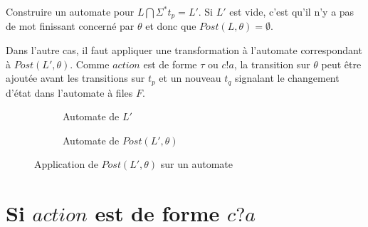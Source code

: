 Construire un automate pour $L\bigcap\Sigma^*t_p=L'$. Si $L'$ est vide, c'est qu'il n'y a pas de mot finissant concerné par $\theta$ et donc que $Post(L,\theta)=\emptyset$.

Dans l'autre cas, il faut appliquer une transformation à l'automate correspondant à $Post(L',\theta)$. Comme $action$ est de forme $\tau$ ou $c!a$, la transition sur $\theta$ peut être ajoutée avant les transitions sur $t_p$ et un nouveau $t_q$ signalant le changement d'état dans l'automate à files $F$.

\begin{figure}[H]
    \centering
    \begin{subfigure}{0.5\linewidth}
        \centering
        \caption{Automate de $L'$}
    \end{subfigure}\hfill
    \begin{subfigure}{0.5\linewidth}
        \centering
        \caption{Automate de $Post(L',\theta)$}
    \end{subfigure}
    \caption{Application de $Post(L',\theta)$ sur un automate}
\end{figure}





\section{Si $action$ est de forme $c?a$}

